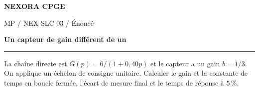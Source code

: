\documentclass[11pt,a4paper]{article}
\begin{document}
{\small\bfseries\color{nexorablue} NEXORA CPGE}\par
{\small MP / NEX-SLC-03 / Énoncé}\par
{\LARGE\bfseries Un capteur de gain différent de un}\par
\vspace{0.25em}\hrule\vspace{0.6em}

La chaîne directe est $G(p)=6/(1+0{,}40p)$ et le capteur a un gain $b=1/3$. On applique un échelon de consigne unitaire. Calculer le gain et la constante de temps en boucle fermée, l’écart de mesure final et le temps de réponse à $5\,\%$.
\end{document}
